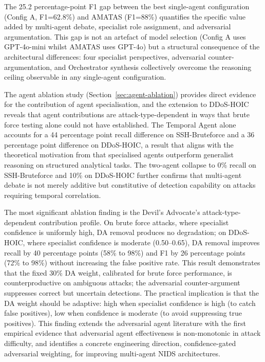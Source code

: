 The 25.2 percentage-point F1 gap between the best single-agent configuration (Config A, F1=62.8\%) and AMATAS (F1=88\%) quantifies the specific value added by multi-agent debate, specialist role assignment, and adversarial argumentation. This gap is not an artefact of model selection (Config A uses GPT-4o-mini whilst AMATAS uses GPT-4o) but a structural consequence of the architectural differences: four specialist perspectives, adversarial counter-argumentation, and Orchestrator synthesis collectively overcome the reasoning ceiling observable in any single-agent configuration.

The agent ablation study (Section~\ref{sec:agent-ablation}) provides direct evidence for the contribution of agent specialisation, and the extension to DDoS-HOIC reveals that agent contributions are attack-type-dependent in ways that brute force testing alone could not have established. The Temporal Agent alone accounts for a 44 percentage point recall difference on SSH-Bruteforce and a 36 percentage point difference on DDoS-HOIC, a result that aligns with the theoretical motivation from \textcite{Du2023} that specialised agents outperform generalist reasoning on structured analytical tasks. The two-agent collapse to 0\% recall on SSH-Bruteforce and 10\% on DDoS-HOIC further confirms that multi-agent debate is not merely additive but constitutive of detection capability on attacks requiring temporal correlation.

The most significant ablation finding is the Devil's Advocate's attack-type-dependent contribution profile. On brute force attacks, where specialist confidence is uniformly high, DA removal produces no degradation; on DDoS-HOIC, where specialist confidence is moderate (0.50--0.65), DA removal improves recall by 40 percentage points (58\% to 98\%) and F1 by 26 percentage points (72\% to 98\%) without increasing the false positive rate. This result demonstrates that the fixed 30\% DA weight, calibrated for brute force performance, is counterproductive on ambiguous attacks; the adversarial counter-argument suppresses correct but uncertain detections. The practical implication is that the DA weight should be adaptive: high when specialist confidence is high (to catch false positives), low when confidence is moderate (to avoid suppressing true positives). This finding extends the adversarial agent literature \autocite{Yin2024, Du2023, Chan2023} with the first empirical evidence that adversarial agent effectiveness is non-monotonic in attack difficulty, and identifies a concrete engineering direction, confidence-gated adversarial weighting, for improving multi-agent NIDS architectures.

